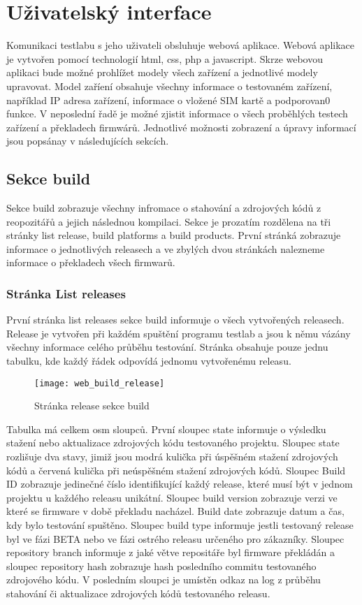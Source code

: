 \chapter{Uživatelský interface}
Komunikaci testlabu s jeho uživateli obsluhuje webová aplikace. Webová aplikace je vytvořen pomocí technologií html, css, php a javascript. Skrze webovou aplikaci bude možné prohlížet modely všech zařízení a jednotlivé modely upravovat. Model zaříení obsahuje všechny informace o testovaném zařízení, například IP adresa zařízení, informace o vložené SIM kartě a podporovan0 funkce. V neposlední řadě je možné  zjistit informace o všech proběhlých testech zařízení a překladech firmwárů. Jednotlivé možnosti zobrazení a úpravy informací jsou popsánay v následujících sekcích.

\section{Sekce build}
Sekce build zobrazuje všechny infromace o stahování a zdrojových kódů z reopozitářů a jejich následnou kompilaci. Sekce je prozatím rozdělena na tři stránky list release, build platforms a build products. První stránká zobrazuje informace o jednotlivých releasech a ve zbylých dvou stránkách nalezneme informace o překladech všech firmwarů.

\subsection{Stránka List releases}
První stránka list releases sekce build informuje o všech vytvořených releasech. Release je vytvořen při každém spuštění programu testlab a jsou k němu vázány všechny informace celého průběhu testování. Stránka obsahuje pouze jednu tabulku, kde každý řádek odpovídá jednomu vytvořenému releasu.

\begin{figure}[h]
  \centering
  \texttt{[image: web\_build\_release]}
  \caption{Stránka release sekce build}
  \label{fig:web_build_release}
\end{figure}

Tabulka má celkem osm sloupců. První sloupec state informuje o výsledku stažení nebo aktualizace zdrojových kódu testovaného projektu. Sloupec state rozlišuje dva stavy, jimiž jsou modrá kulička při úspěšném stažení zdrojových kódů a červená kulička při neúspěšném stažení zdrojových kódů. Sloupec Build ID zobrazuje jedinečné číslo identifikující každý release, které musí být v jednom projektu u každého releasu unikátní. Sloupec build version zobrazuje verzi ve které se firmware v době překladu nacházel. Build date zobrazuje datum a čas, kdy bylo testování spuštěno. Sloupec build type informuje jestli testovaný release byl ve fázi BETA nebo ve fázi ostrého releasu určeného pro zákazníky. Sloupec repository branch informuje z jaké větve repositáře byl firmware překládán a sloupec repository hash zobrazuje hash posledního commitu testovaného zdrojového kódu. V posledním sloupci je umístěn odkaz na log z průběhu stahování či aktualizace zdrojových kódů testovaného releasu.

